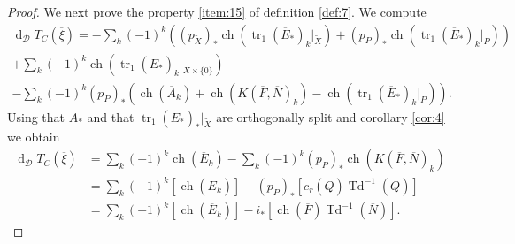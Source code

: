 \documentclass[10pt,twoside]{article}
\numberwithin{equation}{section}
\theoremstyle{plain}
\theoremstyle{definition}
\DeclareMathOperator{\tr}{tr}
\DeclareMathOperator{\Td}{Td}
\DeclareMathOperator{\dd}{d}
\DeclareMathOperator{\ch}{ch}
\begin{document}
\begin{proof}
  We next prove the property \ref{item:15} of definition \ref{def:7}.
  We compute
  \begin{multline*}
    \dd_{\mathcal{D}} T_{C}(\overline{\xi})=
    -\sum_{k}(-1)^{k}\left((p_{\widetilde
        X})_{\ast}\ch(\tr_{1}(\overline E_{\ast})_{k}|_{\widetilde X})+
      (p_{P})_{\ast}\ch(\tr_{1}(\overline E_{\ast})_{k}|_{P})\right)\\
    +\sum_{k}(-1)^{k}\ch(\tr_{1}(\overline E_{\ast})_{k}|_{X\times \{0\}})\\
    -\sum_{k}(-1)^{k}(p_{P})_{\ast}\left(\ch(\overline
      A_{k})+\ch(K(\overline F,\overline N)_{k})- 
      \ch(\tr_{1}(\overline E_{\ast})_{k}|_{P}) 
    \right).
  \end{multline*}
  Using that $\overline A_{\ast}$ and that $\tr_{1}(\overline
  E_{\ast})_{\ast}|_{\widetilde X}$ are 
  orthogonally split and corollary \ref{cor:4} we obtain 
  \begin{align*}
    \dd_{\mathcal{D}}
    T_{C}(\overline{\xi})&=\sum_{k}(-1)^{k}\ch(\overline E_{k})- 
    \sum_{k}(-1)^{k}(p_{P})_{\ast}\ch(K(\overline F,\overline N)_{k}) 
    \\
    &=\sum_{k}(-1)^{k}[\ch(\overline E_{k})]-
    (p_{P})_{\ast} [c_{r}(\overline Q)\Td^{-1}(\overline Q)]
    \\
    &= \sum_{k}(-1)^{k}[\ch(\overline E_{k})]-
    i_{\ast}[\ch(\overline F) \Td^{-1}(\overline N)].
  \end{align*}
  

\end{proof}
\end{document}
